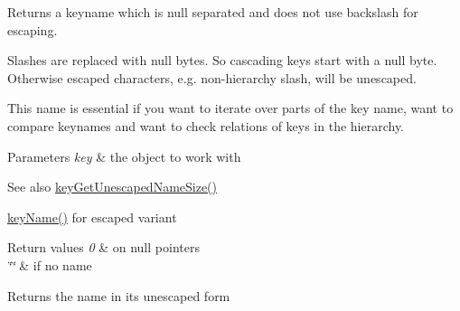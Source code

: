 Returns a keyname which is null separated and does not use backslash for escaping. 

Slashes are replaced with null bytes. So cascading keys start with a null byte. Otherwise escaped characters, e.\+g. non-\/hierarchy slash, will be unescaped.

This name is essential if you want to iterate over parts of the key name, want to compare keynames and want to check relations of keys in the hierarchy.


\begin{DoxyParams}{Parameters}
{\em key} & the object to work with\\
\hline
\end{DoxyParams}
\begin{DoxySeeAlso}{See also}
\hyperlink{group__keyname_ga5e7eff0c77678420199d0d2e8729152b}{key\+Get\+Unescaped\+Name\+Size()} 

\hyperlink{group__keyname_ga8e805c726a60da921d3736cda7813513}{key\+Name()} for escaped variant 
\end{DoxySeeAlso}

\begin{DoxyRetVals}{Return values}
{\em 0} & on null pointers \\
\hline
{\em \char`\"{}\char`\"{}} & if no name \\
\hline
\end{DoxyRetVals}
\begin{DoxyReturn}{Returns}
the name in its unescaped form 
\end{DoxyReturn}
